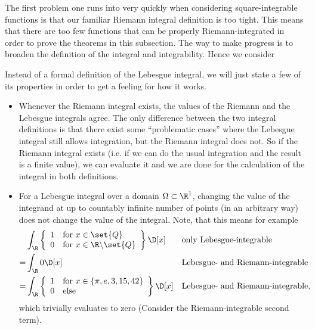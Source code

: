 \noindent
The first problem one runs into very quickly when considering square-integrable functions is that our familiar Riemann integral definition is too tight. 
This means that there are too few functions that can be properly Riemann-integrated in order to prove the theorems in this subsection.
The way to make progress is to broaden the definition of the integral and integrability. 
Hence we consider

\begin{rem} 
	\label{intLebesgue}
	Instead of a formal definition of the Lebesgue integral, we will just state a few of its properties in order to get a feeling for how it works.
	\begin{itemize}
		\item Whenever the Riemann integral exists, the values of the Riemann and the Lebesgue integrals agree. 
			The only difference between the two integral definitions is that there exist some ``problematic cases'' where the Lebesgue integral still allows integration, but the Riemann integral does not.
			So if the Riemann integral exists (i.e. if we can do the usual integration and the result is a finite value), we can evaluate it and we are done for the calculation of the integral in both definitions.
		\item For a Lebesgue integral over a domain $\Omega \subset \R^1$, changing the value of the integrand at up to countably infinite number of points (in an arbitrary way) does not change the value of the integral. 
			Note, that this means for example 
			\begin{align}
				\nonumber
				&\int_\R \left\{
				\begin{array}{ll}
					1 & \text{for $x \in \set{Q}$} \\
					0 & \text{for $x \in \R \backslash \set{Q}$}
				\end{array}
				\right\} \D[x] &&\text{only Lebesgue-integrable} \\
				\nonumber
				= &\int_\R 0 \D[x] && \text{Lebesgue- and Riemann-integrable}\\
				= &\int_\R \left\{
				\begin{array}{ll}
					1 & \text{for $x \in \{\pi, e, 3, 15, 42\}$} \\
					0 & \text{else}
				\end{array}
				\right\} \D[x] &&\text{Lebesgue- and Riemann-integrable}, 			
				\label{exampleLebesqueIntegral}
			\end{align}
			which trivially evaluates to zero (Consider the Riemann-integrable second term).

\end{itemize}
\end{rem}
